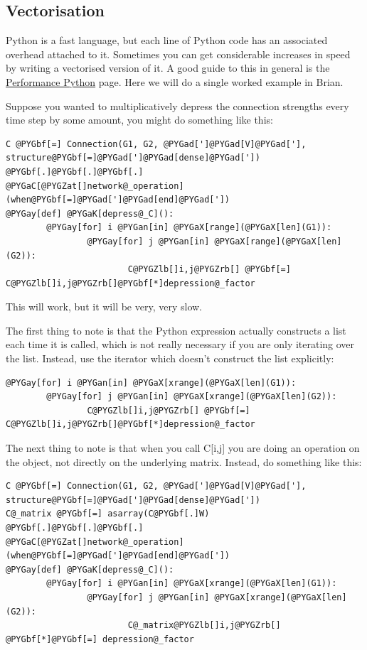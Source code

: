 \documentclass[letterpaper,10pt,english]{manual}
\begin{document}
\subsection{Vectorisation}

Python is a fast language, but each line of Python code has an
associated overhead attached to it. Sometimes you can get considerable
increases in speed by writing a vectorised version of it. A good guide
to this in general is the \href{http://www.scipy.org/PerformancePython}{Performance Python}
page. Here we will do a single worked example in Brian.

Suppose you wanted to multiplicatively depress the connection
strengths every time step by some amount, you might do something like
this:

\begin{Verbatim}[commandchars=@\[\]]
C @PYGbf[=] Connection(G1, G2, @PYGad[']@PYGad[V]@PYGad['], structure@PYGbf[=]@PYGad[']@PYGad[dense]@PYGad['])
@PYGbf[.]@PYGbf[.]@PYGbf[.]
@PYGaC[@PYGZat[]network@_operation](when@PYGbf[=]@PYGad[']@PYGad[end]@PYGad['])
@PYGay[def] @PYGaK[depress@_C]():
        @PYGay[for] i @PYGan[in] @PYGaX[range](@PYGaX[len](G1)):
                @PYGay[for] j @PYGan[in] @PYGaX[range](@PYGaX[len](G2)):
                        C@PYGZlb[]i,j@PYGZrb[] @PYGbf[=] C@PYGZlb[]i,j@PYGZrb[]@PYGbf[*]depression@_factor
\end{Verbatim}

This will work, but it will be very, very slow.

The first thing to note is that the Python expression 
actually constructs a list \code{{[}0,1,2,...,N-1{]}} each time it is called,
which is not really necessary if you are only iterating over the list.
Instead, use the  iterator which doesn't construct the list
explicitly:

\begin{Verbatim}[commandchars=@\[\]]
@PYGay[for] i @PYGan[in] @PYGaX[xrange](@PYGaX[len](G1)):
        @PYGay[for] j @PYGan[in] @PYGaX[xrange](@PYGaX[len](G2)):
                C@PYGZlb[]i,j@PYGZrb[] @PYGbf[=] C@PYGZlb[]i,j@PYGZrb[]@PYGbf[*]depression@_factor
\end{Verbatim}

The next thing to note is that when you call C{[}i,j{]} you are doing an
operation on the \hyperlink{brian.Connection}{} object, not directly on the underlying
matrix. Instead, do something like this:

\begin{Verbatim}[commandchars=@\[\]]
C @PYGbf[=] Connection(G1, G2, @PYGad[']@PYGad[V]@PYGad['], structure@PYGbf[=]@PYGad[']@PYGad[dense]@PYGad['])
C@_matrix @PYGbf[=] asarray(C@PYGbf[.]W)
@PYGbf[.]@PYGbf[.]@PYGbf[.]
@PYGaC[@PYGZat[]network@_operation](when@PYGbf[=]@PYGad[']@PYGad[end]@PYGad['])
@PYGay[def] @PYGaK[depress@_C]():
        @PYGay[for] i @PYGan[in] @PYGaX[xrange](@PYGaX[len](G1)):
                @PYGay[for] j @PYGan[in] @PYGaX[xrange](@PYGaX[len](G2)):
                        C@_matrix@PYGZlb[]i,j@PYGZrb[] @PYGbf[*]@PYGbf[=] depression@_factor
\end{Verbatim}
\end{document}
